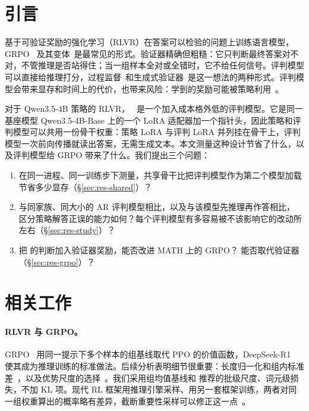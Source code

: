 
\section{引言}\label{sec:intro}

基于可验证奖励的强化学习（RLVR）在答案可以检验的问题上训练语言模型，GRPO~\cite{shao2024deepseekmath,deepseek2025r1} 及其变体~\cite{liu2025understanding,liu2026tricks}是最常见的形式。验证器精确但粗糙：它只判断最终答案对不对，不管推理是否站得住；当一组样本全对或全错时，它不给任何信号。评判模型可以直接给推理打分，过程监督~\cite{lightman2024verify,wang2024mathshepherd}和生成式验证器~\cite{zhang2024genverifier}是这一想法的两种形式。评判模型会带来显存和时间上的代价，也带来风险：学到的奖励可能被策略利用~\cite{gao2023scaling,skalse2022defining}。

对于 Qwen3.5-4B 策略的 RLVR，\kev{}~\cite{kev4b} 是一个加入成本格外低的评判模型。它是同一基座模型 Qwen3.5-4B-Base 上的一个 LoRA 适配器加一个指针头，因此策略和评判模型可以共用一份骨干权重：策略 LoRA 与评判 LoRA 并列挂在骨干上，评判模型一次前向传播就读出答案，无需生成文本。本文测量这种设计节省了什么，以及评判模型给 GRPO 带来了什么。我们提出三个问题：
\begin{enumerate}
\item 在同一进程、同一训练步下测量，共享骨干比把评判模型作为第二个模型加载节省多少显存（\S\ref{sec:res-shared}）？
\item 与同家族、同大小的 AR 评判模型相比，以及与该模型先推理再作答相比，\kev{} 区分策略解答正误的能力如何？每个评判模型有多容易被不该影响它的改动所左右（\S\ref{sec:res-study}）？
\item 把 \kev{} 的判断加入验证器奖励，能否改进 MATH 上的 GRPO？\kev{} 能否取代验证器（\S\ref{sec:res-grpo}）？
\end{enumerate}

\section{相关工作}\label{sec:related}

\paragraph{RLVR 与 GRPO。} GRPO~\cite{shao2024deepseekmath} 用同一提示下多个样本的组基线取代 PPO 的价值函数，DeepSeek-R1~\cite{deepseek2025r1} 使其成为推理训练的标准做法。后续分析表明细节很重要：长度归一化和组内标准差~\cite{liu2025understanding}，以及优势尺度的选择~\cite{liu2026tricks}。我们采用组均值基线和 \citet{liu2026tricks} 推荐的批级尺度、词元级损失，不加 KL 项。现代 RL 框架用推理引擎采样、用另一套框架训练，两者对同一组权重算出的概率略有差异，截断重要性采样可以修正这一点~\cite{yao2025offpolicy}。

